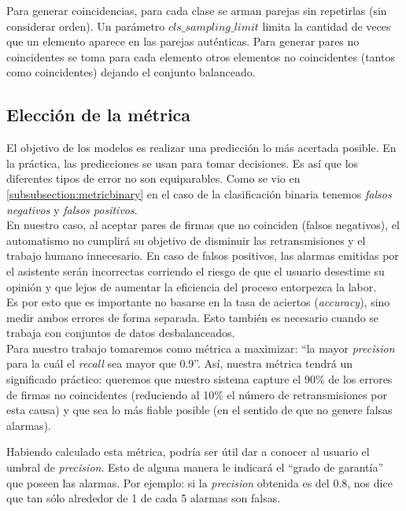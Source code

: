 Para generar coincidencias, para cada clase se arman parejas sin repetirlas (sin considerar orden). Un parámetro $cls\_sampling\_limit$ limita la cantidad de veces que un elemento aparece en las parejas auténticas. Para generar pares no coincidentes se toma para cada elemento otros elementos no coincidentes (tantos como coincidentes) dejando el conjunto balanceado.

\subsection{Elección de la métrica}

El objetivo de los modelos es realizar una predicción lo más acertada posible. En la práctica, las predicciones se usan para tomar decisiones. Es así que los diferentes tipos de error no son equiparables. Como se vio en \ref{subsubsection:metricbinary} en el caso de la clasificación binaria tenemos \textit{falsos negativos} y \textit{falsos positivos}. \\

En nuestro caso, al aceptar pares de firmas que no coinciden (falsos negativos), el automatismo no cumplirá su objetivo de disminuir las retransmisiones y el trabajo humano innecesario. En caso de falsos positivos, las alarmas emitidas por el asistente serán incorrectas corriendo el riesgo de que el usuario desestime su opinión y que lejos de aumentar la eficiencia del proceso entorpezca la labor. \\

Es por esto que es importante no basarse en la tasa de aciertos (\textit{accuracy}), sino medir ambos errores de forma separada. Esto también es necesario cuando se trabaja con conjuntos de datos desbalanceados.\\

Para nuestro trabajo tomaremos como métrica a maximizar: ``la mayor \textit{precision} para la cuál el \textit{recall} sea mayor que 0.9''. Así, nuestra métrica tendrá un significado práctico: queremos que nuestro sistema capture el 90\% de los errores de firmas no coincidentes (reduciendo al 10\% el número de retransmisiones por esta causa) y que sea lo más fiable posible (en el sentido de que no genere falsas alarmas).

Habiendo calculado esta métrica, podría ser útil dar a conocer al usuario el umbral de \textit{precision}. Esto de alguna manera le indicará el ``grado de garantía'' que poseen las alarmas. Por ejemplo: si la \textit{precision} obtenida es del 0.8, nos dice que tan sólo alrededor de 1 de cada 5 alarmas son falsas.

